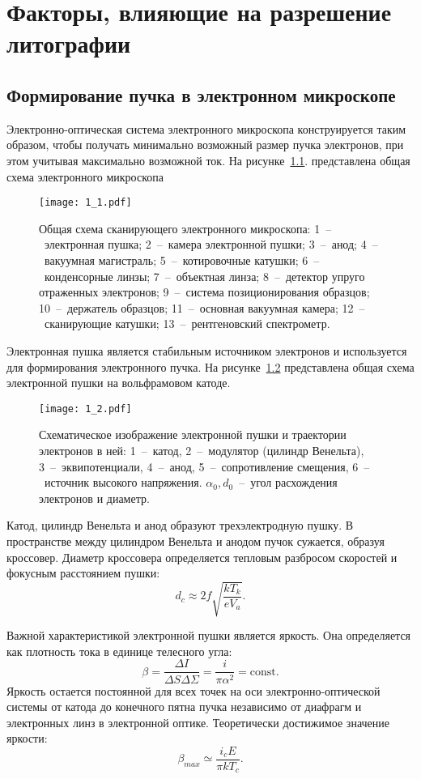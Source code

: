 \chapter{Факторы, влияющие на разрешение литографии}
\section{Формирование пучка в электронном микроскопе}

Электронно-оптическая система электронного микроскопа конструируется таким образом, чтобы получать минимально возможный размер пучка электронов, при этом учитывая максимально возможной ток. На рисунке~\ref{fig:1}. представлена общая схема электронного микроскопа

\begin{figure}[H]
\center
\texttt{[image: 1\_1.pdf]}
\caption{Общая схема сканирующего электронного микроскопа: 1~--~электронная пушка; 2~--~камера электронной пушки; 3~--~анод; 4~--~вакуумная магистраль; 5~--~котировочные катушки; 6~--~конденсорные линзы; 7~--~объектная линза; 8~--~детектор упруго отраженных электронов; 9~--~система позиционирования образцов; 10~--~держатель образцов; 11~--~основная вакуумная камера; 12~--~сканирующие катушки; 13~--~рентгеновский спектрометр.}
\label{fig:1}
\end{figure}

Электронная пушка является стабильным источником электронов и используется для формирования электронного пучка. На рисунке~\ref{fig:2} представлена общая схема электронной пушки на вольфрамовом катоде.

\begin{figure}[H]
\center
\texttt{[image: 1\_2.pdf]}
\caption{Схематическое изображение электронной пушки и траектории электронов в ней: 1~--~катод, 2~--~модулятор (цилиндр Венельта), 3~--~эквипотенциали, 4~--~анод, 5~--~сопротивление смещения, 6~--~источник высокого напряжения. $\alpha_0, d_0$~--~угол расхождения электронов и диаметр.}
\label{fig:2}
\end{figure}

Катод, цилиндр Венельта и анод образуют трехэлектродную пушку. В пространстве между цилиндром Венельта и анодом пучок сужается, образуя кроссовер.
Диаметр кроссовера определяется тепловым разбросом скоростей и фокусным расстоянием пушки:
\begin{equation}
d_c \approx 2f \sqrt{\frac{kT_k}{eV_a}}.
\label{eq:A1}
\end{equation}

Важной характеристикой электронной пушки является яркость. Она определяется как плотность тока в единице телесного угла:
\begin{equation}
\beta = \frac{\Delta I}{\Delta S\Delta\Sigma}= \frac{i}{\pi \alpha^2}= \mathrm{const}.
\label{eq:A2}
\end{equation}
Яркость остается постоянной для всех точек на оси электронно-оптической системы от катода до конечного пятна пучка независимо от диафрагм и электронных линз в электронной оптике. Теоретически достижимое значение яркости:
\begin{equation}
\beta_{max} \simeq \frac{i_c E}{\pi kT_c}.
\label{eq:A3}
\end{equation}

